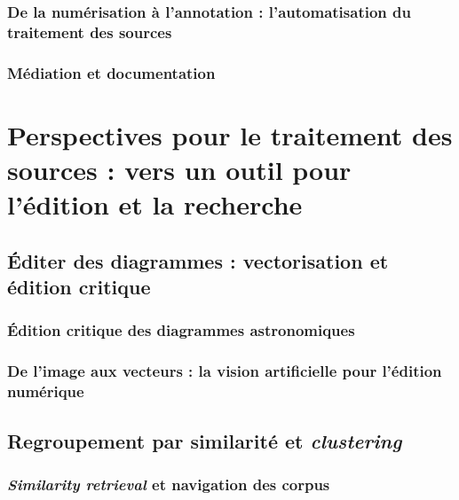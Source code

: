 \documentclass[a4paper,12pt,twoside]{book}
\newcommand{\clearemptydoublepage}{\newpage{\pagestyle{empty}\cleardoublepage}}
\begin{document}
                \section[\textit{Workflow} de traitement des sources]{De la numérisation à l’annotation : l'automatisation du traitement des sources}
                    
             
                \section{Médiation et documentation}
                    
            
        \clearemptydoublepage

    \part{Perspectives pour le traitement des sources : vers un outil pour l’édition et la recherche}
        \chapter[Éditer des diagrammes]{Éditer des diagrammes : vectorisation et édition critique}
                \section{Édition critique des diagrammes astronomiques}
                    
            
                \section[De l’image aux vecteurs]{De l’image aux vecteurs : la vision artificielle pour l’édition numérique}
                    
            
        \clearemptydoublepage
        
        \chapter{Regroupement par similarité et \textit{clustering}}
                \section{\textit{Similarity retrieval} et navigation des corpus}
                    
            
\end{document}
